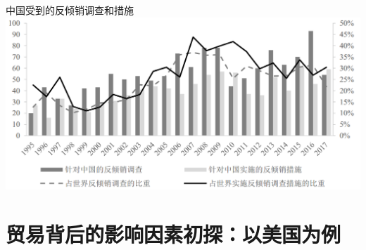 \documentclass[10pt,hyperref={CJKbookmarks=true},xcolor=dvipsnames,aspectratio=169]{beamer}
\begin{document}
\begin{frame}{中国受到的反倾销调查和措施}
\centering \includegraphics[scale=0.55]{fig/gravity/china5}
\end{frame}


\section{贸易背后的影响因素初探：以美国为例}
\end{document}
